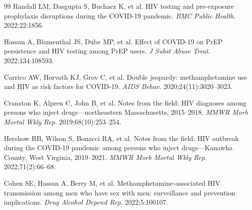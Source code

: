 \documentclass[12pt]{article}
\begin{document}
\begin{thebibliography}{99}
 Randall LM, Dasgupta S, Buchacz K, et al. HIV testing and pre-exposure prophylaxis disruptions during the COVID-19 pandemic. \textit{BMC Public Health}. 2022;22:1856.

 Hassan A, Blumenthal JS, Dube MP, et al. Effect of COVID-19 on PrEP persistence and HIV testing among PrEP users. \textit{J Subst Abuse Treat}. 2022;134:108593.

 Carrico AW, Horvath KJ, Grov C, et al. Double jeopardy: methamphetamine use and HIV as risk factors for COVID-19. \textit{AIDS Behav}. 2020;24(11):3020--3023.

 Cranston K, Alpren C, John B, et al. Notes from the field: HIV diagnoses among persons who inject drugs---northeastern Massachusetts, 2015--2018. \textit{MMWR Morb Mortal Wkly Rep}. 2019;68(10):253--254.

 Hershow RB, Wilson S, Bonacci RA, et al. Notes from the field: HIV outbreak during the COVID-19 pandemic among persons who inject drugs---Kanawha County, West Virginia, 2019--2021. \textit{MMWR Morb Mortal Wkly Rep}. 2022;71(2):66--68.

 Cohen SE, Hassan A, Berry M, et al. Methamphetamine-associated HIV transmission among men who have sex with men: surveillance and prevention implications. \textit{Drug Alcohol Depend Rep}. 2022;5:100107.
\end{thebibliography}
\end{document}

